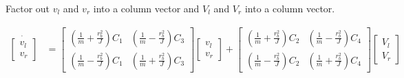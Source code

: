 Factor out $v_l$ and $v_r$ into a column vector and $V_l$ and $V_r$ into a
column vector.

\begin{align*}
  \dot{\begin{bmatrix}
    v_l \\
    v_r
  \end{bmatrix}} &=
  \begin{bmatrix}
    \left(\frac{1}{m} + \frac{r_b^2}{J}\right) C_1 &
    \left(\frac{1}{m} - \frac{r_b^2}{J}\right) C_3 \\
    \left(\frac{1}{m} - \frac{r_b^2}{J}\right) C_1 &
    \left(\frac{1}{m} + \frac{r_b^2}{J}\right) C_3
  \end{bmatrix}
  \begin{bmatrix}
    v_l \\
    v_r
  \end{bmatrix} +
  \begin{bmatrix}
    \left(\frac{1}{m} + \frac{r_b^2}{J}\right) C_2 &
    \left(\frac{1}{m} - \frac{r_b^2}{J}\right) C_4 \\
    \left(\frac{1}{m} - \frac{r_b^2}{J}\right) C_2 &
    \left(\frac{1}{m} + \frac{r_b^2}{J}\right) C_4
  \end{bmatrix}
  \begin{bmatrix}
    V_l \\
    V_r
  \end{bmatrix}
\end{align*}

